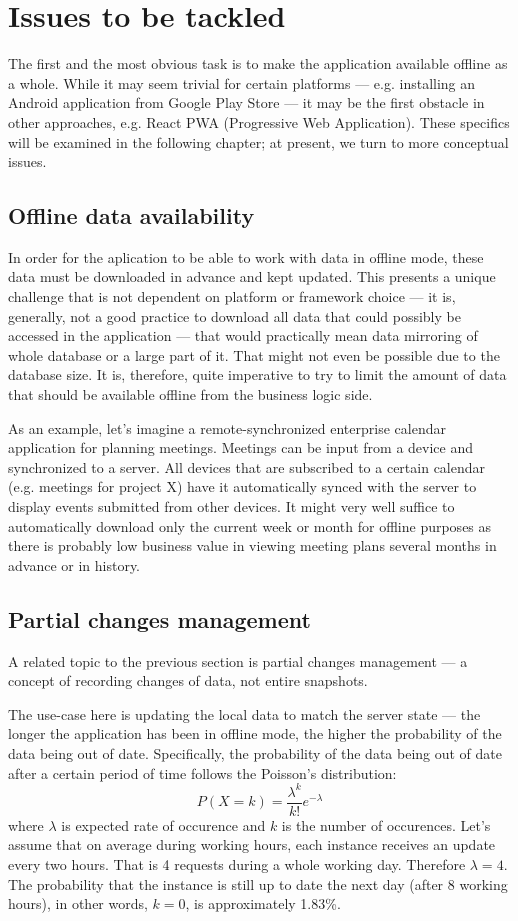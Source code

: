 \documentclass[
  digital,     %
  color,       %
  oneside,     %
  nosansbold,  %
  nocolorbold, %
  lof,         %
  lot,         %
]{fithesis4}
\begin{document}
\section{Issues to be tackled}
The first and the most obvious task is to make the application available offline as a whole. While it may seem trivial for certain platforms --- e.g. installing an Android application from Google Play Store --- it may be the first obstacle in other approaches, e.g. React PWA (Progressive Web Application). These specifics will be examined in the following chapter; at present, we turn to more conceptual issues.
\subsection{Offline data availability}
In order for the aplication to be able to work with data in offline mode, these data must be downloaded in advance and kept updated. This presents a unique challenge that is not dependent on platform or framework choice --- it is, generally, not a good practice to download all data that could possibly be accessed in the application --- that would practically mean data mirroring of whole database or a large part of it. That might not even be possible due to the database size. It is, therefore, quite imperative to try to limit the amount of data that should be available offline from the business logic side.

As an example, let's imagine a remote-synchronized enterprise calendar application for planning meetings. Meetings can be input from a device and synchronized to a server. All devices that are subscribed to a certain calendar (e.g. meetings for project X) have it automatically synced with the server to display events submitted from other devices. It might very well suffice to automatically download only the current week or month for offline purposes as there is probably low business value in viewing meeting plans several months in advance or in history. 

\subsection{Partial changes management}
A related topic to the previous section is partial changes management --- a concept of recording changes of data, not entire snapshots. 

The use-case here is updating the local data to match the server state --- the longer the application has been in offline mode, the higher the probability of the data being out of date. Specifically, the probability of the data being out of date after a certain period of time follows the Poisson's distribution\cite{poissonArticle}: \begin{equation}P(X = k) = \frac{ \lambda^k }{k!} e^{-\lambda} \end{equation} where $\lambda$ is expected rate of occurence and $k$ is the number of occurences. Let's assume that on average during working hours, each instance receives an update every two hours. That is 4 requests during a whole working day. Therefore $\lambda = 4$. The probability that the instance is still up to date the next day (after 8 working hours), in other words, $k = 0$, is approximately 1.83\%.
\end{document}

